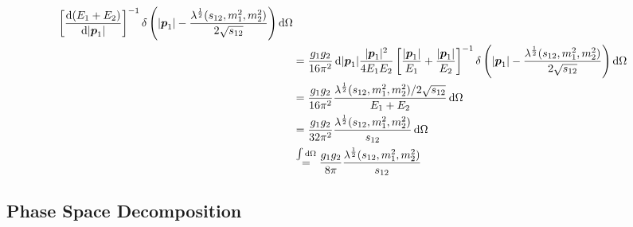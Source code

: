 \documentclass[
  a4paper,             %
  11pt,                %
  oneside,             %
  onecolumn,           %
  bibliography=totoc,  %
  final,               %
]{scrartcl}
\begin{document}
\begin{subequations}
\begin{align}
    \left[ \ddfrac{(E_1 + E_2)}{\abs{\vt p_1}} \right]^{-1}
    \delta\left( \abs{\vt p_1} - \frac{\lambda^{\frac{1}{2}}(s_{12}, m_1^2, m_2^2)}{2 \sqrt{s_{12}}} \right) \dd \Omega \\
    & = \frac{g_1 g_2}{16 \pi^2} \dd \abs{\vt p_1} \frac{\abs{\vt p_1}^2 }{4 E_1 E_2}
    \left[ \frac{\abs{\vt p_1}}{E_1} + \frac{\abs{\vt p_1}}{E_2} \right]^{-1}
    \delta\left( \abs{\vt p_1} - \frac{\lambda^{\frac{1}{2}}(s_{12}, m_1^2, m_2^2)}{2 \sqrt{s_{12}}} \right) \dd \Omega \\
    & = \frac{g_1 g_2}{16 \pi^2}
    \frac{\lambda^{\frac{1}{2}}(s_{12}, m_1^2, m_2^2) / 2 \sqrt{s_{12}}}{E_1 + E_2} \dd \Omega                        \\
    & = \frac{g_1 g_2}{32 \pi^2} \frac{\lambda^{\frac{1}{2}}(s_{12}, m_1^2, m_2^2)}{s_{12}} \dd \Omega                       \\
    & \stackrel{\int \dd \Omega}{=} \frac{g_1 g_2}{8 \pi} \frac{\lambda^{\frac{1}{2}}(s_{12}, m_1^2, m_2^2)}{s_{12}}
  \end{align}
\end{subequations}

\subsection{Phase Space Decomposition}%
\label{sec:phase_space_decomposition}
\end{document}
